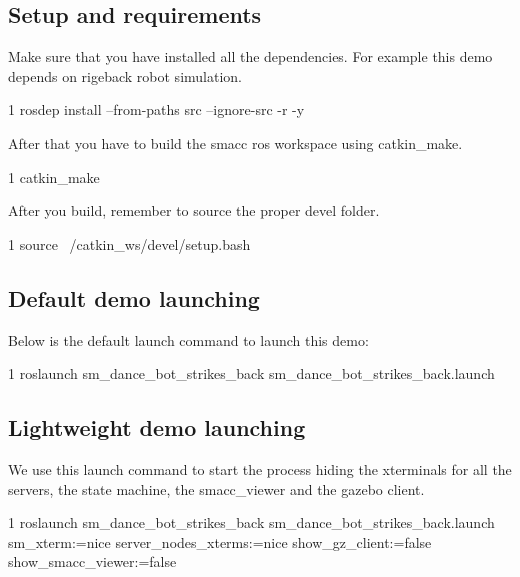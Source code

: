 \subsection*{Setup and requirements}

Make sure that you have installed all the dependencies. For example this demo depends on rigeback robot simulation.


\begin{DoxyCode}
1 rosdep install --from-paths src --ignore-src -r -y 
\end{DoxyCode}


After that you have to build the smacc ros workspace using catkin\+\_\+make.


\begin{DoxyCode}
1 catkin\_make
\end{DoxyCode}


After you build, remember to source the proper devel folder.


\begin{DoxyCode}
1 source ~/catkin\_ws/devel/setup.bash
\end{DoxyCode}


\subsection*{Default demo launching}

Below is the default launch command to launch this demo\+:


\begin{DoxyCode}
1 roslaunch sm\_dance\_bot\_strikes\_back sm\_dance\_bot\_strikes\_back.launch
\end{DoxyCode}


\subsection*{Lightweight demo launching}

We use this launch command to start the process hiding the xterminals for all the servers, the state machine, the smacc\+\_\+viewer and the gazebo client.


\begin{DoxyCode}
1 roslaunch sm\_dance\_bot\_strikes\_back sm\_dance\_bot\_strikes\_back.launch sm\_xterm:=nice
       server\_nodes\_xterms:=nice show\_gz\_client:=false show\_smacc\_viewer:=false
\end{DoxyCode}
 